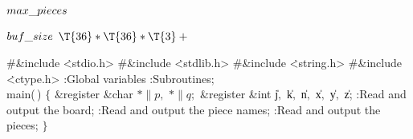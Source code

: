 \Y\B\4\D$\\{max\_pieces}$ \5
\par
\B\4\D$\\{buf\_size}$ \5
$\T{36}*\T{36}*\T{3}+{}$\par
\Y\B\8\#\&{include} \.{<stdio.h>}\6
\8\#\&{include} \.{<stdlib.h>}\6
\8\#\&{include} \.{<string.h>}\6
\8\#\&{include} \.{<ctype.h>}\6
:Global variables\X\6
:Subroutines\X;\7
\\{main}(\,)\1\1\2\2\6
${}\{{}$\1\6
\&{register} \&{char} ${}{*}\|p,{}$ ${}{*}\|q;{}$\6
\&{register} \&{int} \|j${},{}$ \|k${},{}$ \|n${},{}$ \|x${},{}$ \|y${},{}$ %
\|z;\7
:Read and output the board\X;\6
:Read and output the piece names\X;\6
:Read and output the pieces\X;\6
\4${}\}{}$\2\par
\fi

